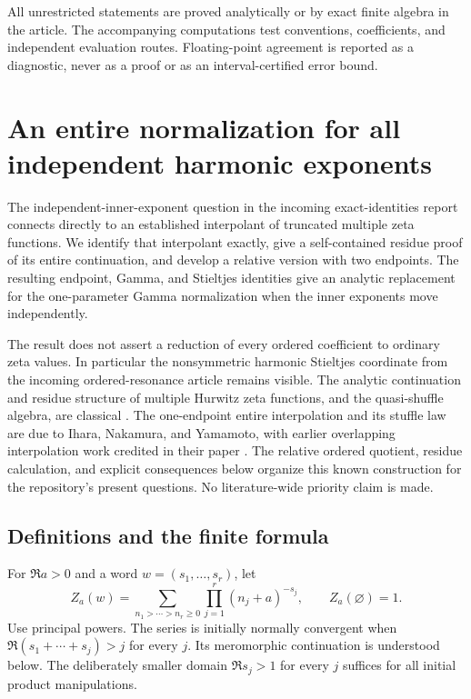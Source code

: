 \documentclass[11pt]{article}
\numberwithin{equation}{section}
\theoremstyle{plain}
\theoremstyle{definition}
\theoremstyle{remark}
\begin{document}
All unrestricted statements are proved analytically or by exact finite
algebra in the article. The accompanying computations test conventions,
coefficients, and independent evaluation routes. Floating-point
agreement is reported as a diagnostic, never as a proof or as an
interval-certified error bound.



\section{An entire normalization for all independent harmonic exponents}
\label{eht:sec}

The independent-inner-exponent question in the incoming exact-identities
report connects directly to an established interpolant of truncated
multiple zeta functions.  We identify that interpolant exactly, give a
self-contained residue proof of its entire continuation, and develop a
relative version with two endpoints.  The resulting endpoint, Gamma, and
Stieltjes identities give an analytic replacement for the one-parameter
Gamma normalization when the inner exponents move independently.

The result does not assert a reduction of every ordered coefficient to
ordinary zeta values.  In particular the nonsymmetric harmonic Stieltjes
coordinate from the incoming ordered-resonance article remains visible.
The analytic continuation and residue structure of multiple Hurwitz zeta
functions, and the quasi-shuffle algebra, are classical
\cite{eht:MehtaViswanadham,eht:Hoffman}.  The one-endpoint entire
interpolation and its stuffle law are due to Ihara, Nakamura, and Yamamoto,
with earlier overlapping interpolation work credited in their paper
\cite{eht:INY}.  The relative ordered quotient, residue calculation, and
explicit consequences below organize this known construction for the
repository's present questions.  No literature-wide priority claim is made.

\subsection{Definitions and the finite formula}

For $\Re a>0$ and a word $w=(s_1,\ldots,s_r)$, let
\begin{equation}\label{eht:Z}
 Z_a(w)=\sum_{n_1>\cdots>n_r\ge0}
              \prod_{j=1}^r(n_j+a)^{-s_j},\qquad Z_a(\varnothing)=1.
\end{equation}
Use principal powers.  The series is initially normally convergent when
$\Re(s_1+\cdots+s_j)>j$ for every $j$.  Its meromorphic continuation is
understood below.  The deliberately smaller domain $\Re s_j>1$ for every
$j$ suffices for all initial product manipulations.
\end{document}
